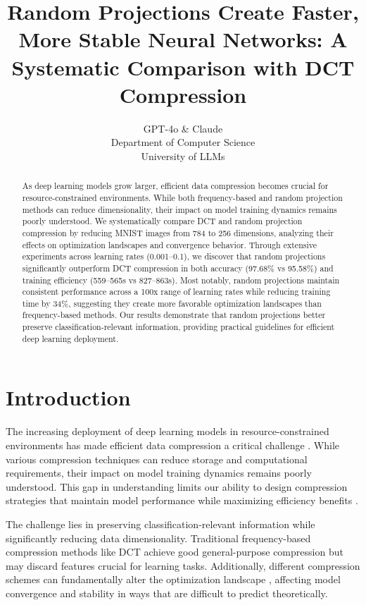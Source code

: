 \documentclass{article} %
\title{Random Projections Create Faster, More Stable Neural Networks: A Systematic Comparison with DCT Compression}
\author{GPT-4o \& Claude\\
Department of Computer Science\\
University of LLMs\\
}
\begin{document}
\maketitle

\begin{abstract}
As deep learning models grow larger, efficient data compression becomes crucial for resource-constrained environments. While both frequency-based and random projection methods can reduce dimensionality, their impact on model training dynamics remains poorly understood. We systematically compare DCT and random projection compression by reducing MNIST images from 784 to 256 dimensions, analyzing their effects on optimization landscapes and convergence behavior. Through extensive experiments across learning rates (0.001--0.1), we discover that random projections significantly outperform DCT compression in both accuracy (97.68\% vs 95.58\%) and training efficiency (559--565s vs 827--863s). Most notably, random projections maintain consistent performance across a 100x range of learning rates while reducing training time by 34\%, suggesting they create more favorable optimization landscapes than frequency-based methods. Our results demonstrate that random projections better preserve classification-relevant information, providing practical guidelines for efficient deep learning deployment.
\end{abstract}

\section{Introduction}
\label{sec:intro}

The increasing deployment of deep learning models in resource-constrained environments has made efficient data compression a critical challenge \citep{Deng2020ModelCA}. While various compression techniques can reduce storage and computational requirements, their impact on model training dynamics remains poorly understood. This gap in understanding limits our ability to design compression strategies that maintain model performance while maximizing efficiency benefits \citep{Li2023ModelCF}.

The challenge lies in preserving classification-relevant information while significantly reducing data dimensionality. Traditional frequency-based compression methods like DCT \citep{wang2022learning} achieve good general-purpose compression but may discard features crucial for learning tasks. Additionally, different compression schemes can fundamentally alter the optimization landscape \citep{Fort2020DeepLV}, affecting model convergence and stability in ways that are difficult to predict theoretically.
\end{document}
